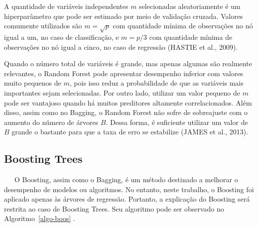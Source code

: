\documentclass[
  12pt,
  a4paper,
]{scrreprt}
\begin{document}
\vspace{12pt}

A quantidade de variáveis independentes \(m\) selecionadas
aleatoriamente é um hiperparâmetro que pode ser estimado por meio de
validação cruzada. Valores comumente utilizados são \(m = \sqrt{p}\) com
quantidade mínima de observações no nó igual a um, no caso de
classificação, e \(m = p/3\) com quantidade mínima de observações no nó
igual a cinco, no caso de regressão (HASTIE et al., 2009).

\vspace{12pt}

Quando o número total de variáveis é grande, mas apenas algumas são
realmente relevantes, o Random Forest pode apresentar desempenho
inferior com valores muito pequenos de \(m\), pois isso reduz a
probabilidade de que as variáveis mais importantes sejam selecionadas.
Por outro lado, utilizar um valor pequeno de \(m\) pode ser vantajoso
quando há muitos preditores altamente correlacionados. Além disso, assim
como no Bagging, o Random Forest não sofre de sobreajuste com o aumento
do número de árvores \(B\). Dessa forma, é suficiente utilizar um valor
de \(B\) grande o bastante para que a taxa de erro se estabilize (JAMES
et al., 2013).

\subsection{Boosting Trees}\label{boosting-trees}

~~~O Boosting, assim como o Bagging, é um método destinado a melhorar o
desempenho de modelos ou algoritmos. No entanto, neste trabalho, o
Boosting foi aplicado apenas às árvores de regressão. Portanto, a
explicação do Boosting será restrita ao caso de Boosting Trees. Seu
algoritmo pode ser observado no  Algoritmo~\ref{algo-boos} .

\vspace{12pt}
\end{document}
